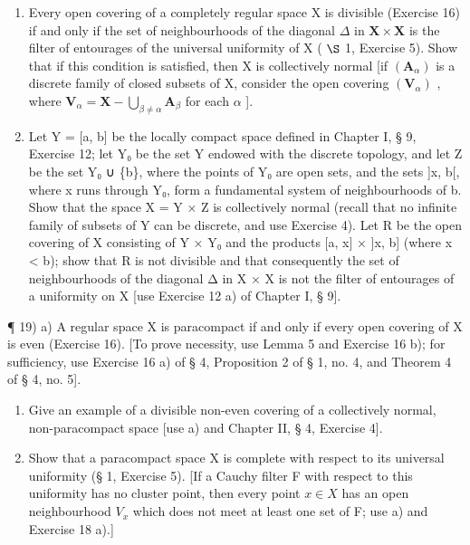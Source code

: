 \begin{enumerate}
\def\labelenumi{\alph{enumi})}
\item
  Every open covering of a completely regular space X is divisible (Exercise 16) if and only if the set of neighbourhoods of the diagonal \(\Delta\) in \(\mathbf{X} \times \mathbf{X}\) is the filter of entourages of the universal uniformity of X ( \(\S\) 1, Exercise 5). Show that if this condition is satisfied, then X is collectively normal {[}if \((\mathbf{A}_{\alpha})\) is a discrete family of closed subsets of X, consider the open covering \((\mathbf{V}_{\alpha})\) , where \(\mathbf{V}_{\alpha} = \mathbf{X} - \bigcup_{\beta \neq \alpha} \mathbf{A}_{\beta}\) for each \(\alpha\) {]}.
\item
  Let Y = {[}a, b{]} be the locally compact space defined in Chapter I, § 9, Exercise 12; let Y₀ be the set Y endowed with the discrete topology, and let Z be the set Y₀ ∪ \{b\}, where the points of Y₀ are open sets, and the sets {]}x, b{[}, where x runs through Y₀, form a fundamental system of neighbourhoods of b. Show that the space X = Y × Z is collectively normal (recall that no infinite family of subsets of Y can be discrete, and use Exercise 4). Let R be the open covering of X consisting of Y × Y₀ and the products {[}a, x{]} × {]}x, b{]} (where x \textless{} b); show that R is not divisible and that consequently the set of neighbourhoods of the diagonal Δ in X × X is not the filter of entourages of a uniformity on X {[}use Exercise 12 a) of Chapter I, § 9{]}.
\end{enumerate}

¶ 19) a) A regular space X is paracompact if and only if every open covering of X is even (Exercise 16). {[}To prove necessity, use Lemma 5 and Exercise 16 b); for sufficiency, use Exercise 16 a) of § 4, Proposition 2 of § 1, no. 4, and Theorem 4 of § 4, no. 5{]}.

\begin{enumerate}
\def\labelenumi{\alph{enumi})}
\setcounter{enumi}{1}
\item
  Give an example of a divisible non-even covering of a collectively normal, non-paracompact space {[}use a) and Chapter II, § 4, Exercise 4{]}.
\item
  Show that a paracompact space X is complete with respect to its universal uniformity (§ 1, Exercise 5). {[}If a Cauchy filter F with respect to this uniformity has no cluster point, then every point \(x \in X\) has an open neighbourhood \(V_{x}\) which does not meet at least one set of F; use a) and Exercise 18 a).{]}
\end{enumerate}

